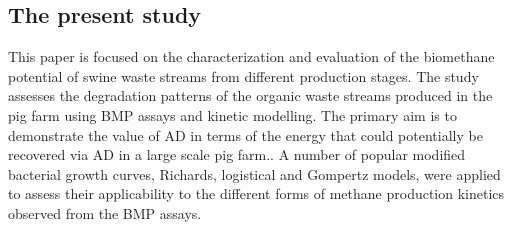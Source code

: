 \subsection{The present study}
This paper is focused on the characterization and evaluation of the biomethane potential of swine waste streams from different production stages. The study assesses the degradation patterns of the organic waste streams produced in the pig farm using BMP assays and kinetic modelling. The primary aim is to demonstrate the value of AD in terms of the energy that could potentially be recovered via AD in a large scale pig farm.. A number of popular modified bacterial growth curves, Richards, logistical and Gompertz models, were applied to assess their applicability to the different forms of methane production kinetics observed from the BMP assays.
